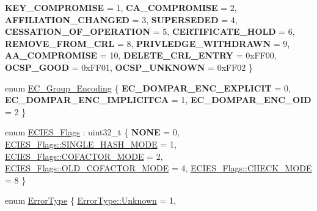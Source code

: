 \begin{DoxyCompactItemize}
{\bfseries K\+E\+Y\+\_\+\+C\+O\+M\+P\+R\+O\+M\+I\+SE} = 1, 
{\bfseries C\+A\+\_\+\+C\+O\+M\+P\+R\+O\+M\+I\+SE} = 2, 
{\bfseries A\+F\+F\+I\+L\+I\+A\+T\+I\+O\+N\+\_\+\+C\+H\+A\+N\+G\+ED} = 3, 
\newline
{\bfseries S\+U\+P\+E\+R\+S\+E\+D\+ED} = 4, 
{\bfseries C\+E\+S\+S\+A\+T\+I\+O\+N\+\_\+\+O\+F\+\_\+\+O\+P\+E\+R\+A\+T\+I\+ON} = 5, 
{\bfseries C\+E\+R\+T\+I\+F\+I\+C\+A\+T\+E\+\_\+\+H\+O\+LD} = 6, 
{\bfseries R\+E\+M\+O\+V\+E\+\_\+\+F\+R\+O\+M\+\_\+\+C\+RL} = 8, 
\newline
{\bfseries P\+R\+I\+V\+L\+E\+D\+G\+E\+\_\+\+W\+I\+T\+H\+D\+R\+A\+WN} = 9, 
{\bfseries A\+A\+\_\+\+C\+O\+M\+P\+R\+O\+M\+I\+SE} = 10, 
{\bfseries D\+E\+L\+E\+T\+E\+\_\+\+C\+R\+L\+\_\+\+E\+N\+T\+RY} = 0x\+F\+F00, 
{\bfseries O\+C\+S\+P\+\_\+\+G\+O\+OD} = 0x\+F\+F01, 
\newline
{\bfseries O\+C\+S\+P\+\_\+\+U\+N\+K\+N\+O\+WN} = 0x\+F\+F02
 \}
\item 
enum \hyperlink{namespace_botan_ad0ee6307c8f311388a2bc00426a7f858}{E\+C\+\_\+\+Group\+\_\+\+Encoding} \{ {\bfseries E\+C\+\_\+\+D\+O\+M\+P\+A\+R\+\_\+\+E\+N\+C\+\_\+\+E\+X\+P\+L\+I\+C\+IT} = 0, 
{\bfseries E\+C\+\_\+\+D\+O\+M\+P\+A\+R\+\_\+\+E\+N\+C\+\_\+\+I\+M\+P\+L\+I\+C\+I\+T\+CA} = 1, 
{\bfseries E\+C\+\_\+\+D\+O\+M\+P\+A\+R\+\_\+\+E\+N\+C\+\_\+\+O\+ID} = 2
 \}
\item 
enum \hyperlink{namespace_botan_a9633493dccb5f879eeafafe99c71f6e8}{E\+C\+I\+E\+S\+\_\+\+Flags} \+: uint32\+\_\+t \{ \newline
{\bfseries N\+O\+NE} = 0, 
\hyperlink{namespace_botan_a9633493dccb5f879eeafafe99c71f6e8a8f077adf8e11b076e88eee680527f81e}{E\+C\+I\+E\+S\+\_\+\+Flags\+::\+S\+I\+N\+G\+L\+E\+\_\+\+H\+A\+S\+H\+\_\+\+M\+O\+DE} = 1, 
\hyperlink{namespace_botan_a9633493dccb5f879eeafafe99c71f6e8a421ba92bce979a3ec3aafaa74a7103d7}{E\+C\+I\+E\+S\+\_\+\+Flags\+::\+C\+O\+F\+A\+C\+T\+O\+R\+\_\+\+M\+O\+DE} = 2, 
\hyperlink{namespace_botan_a9633493dccb5f879eeafafe99c71f6e8a2165f0ab80715b5218d379471e4f59cb}{E\+C\+I\+E\+S\+\_\+\+Flags\+::\+O\+L\+D\+\_\+\+C\+O\+F\+A\+C\+T\+O\+R\+\_\+\+M\+O\+DE} = 4, 
\newline
\hyperlink{namespace_botan_a9633493dccb5f879eeafafe99c71f6e8a2376233bf1de21598ca22c5143aea223}{E\+C\+I\+E\+S\+\_\+\+Flags\+::\+C\+H\+E\+C\+K\+\_\+\+M\+O\+DE} = 8
 \}
\item 
enum \hyperlink{namespace_botan_a8bcd10518370fbf2dcfcb62b17346b94}{Error\+Type} \{ \newline
\hyperlink{namespace_botan_a8bcd10518370fbf2dcfcb62b17346b94a88183b946cc5f0e8c96b2e66e1c74a7e}{Error\+Type\+::\+Unknown} = 1, 

\end{DoxyCompactItemize}
